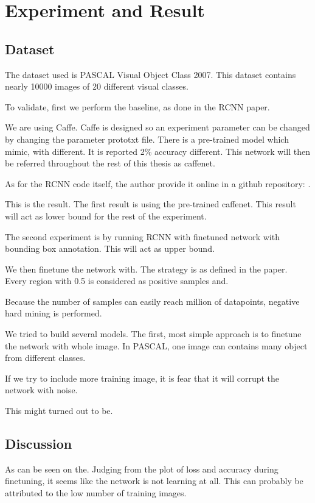 \documentclass[a4paper,11pt]{kth-mag}
\begin{document}
\chapter{Experiment and Result}
\section{Dataset}
The dataset used is PASCAL Visual Object Class 2007. This dataset contains nearly 10000 images of 20 different visual classes.

To validate, first we perform the baseline, as done in the RCNN paper.

We are using Caffe.
Caffe is designed so an experiment parameter can be changed by changing the parameter prototxt file.
There is a pre-trained model which mimic, with different. It is reported 2\% accuracy different. This network will then be referred throughout the rest of this thesis as caffenet.

As for the RCNN code itself, the author provide it online in a github repository: .

This is the result.
The first result is using the pre-trained caffenet. This result will act as lower bound for the rest of the experiment.

The second experiment is by running RCNN with finetuned network with bounding box annotation. This will act as upper bound.

We then finetune the network with. The strategy is as defined in the paper. Every region with 0.5 is considered as positive samples and.

Because the number of samples can easily reach million of datapoints, negative hard mining is performed.

We tried to build several models. The first, most simple approach is to finetune the network with whole image. In PASCAL, one image can contains many object from different classes.

If we try to include more training image, it is fear that it will corrupt the network with noise.

This might turned out to be.

\section{Discussion}
As can be seen on the. Judging from the plot of loss and accuracy during finetuning, it seems like the network is not learning at all.
This can probably be attributed to the low number of training images.
\end{document}
